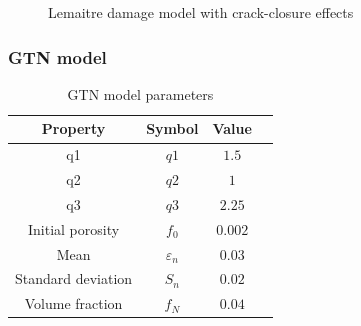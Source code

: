 \documentclass[sn-mathphys,Numbered,draft]{sn-jnl}%
\begin{document}
\begin{figure}[t!]
	\centering
	  \qquad
		
		\caption{Lemaitre damage model with crack-closure effects}
	\label{label_for_entire_figure}
\end{figure}
\FloatBarrier

\subsubsection{GTN model}

\begin{table}[htb]
	\centering
		\begin{tabular}{cccc} \hline
			Property & Symbol & Value  \\ \hline 
			q1 & $q1$ & $1.5$  \\
		    q2 & $q2$ & $1$  \\
		    q3 & $q3$ & $2.25$  \\
		    Initial porosity & $f_0$ & $0.002$  \\
		    Mean & $\varepsilon_n$ & $0.03$  \\
		    Standard deviation & $S_n$ & $0.02$  \\
		    Volume fraction & $f_N$ & $0.04$  \\
			\hline
		\end{tabular}
	\caption{GTN model parameters}
	\label{tab:material_properties}
\end{table}
\end{document}

